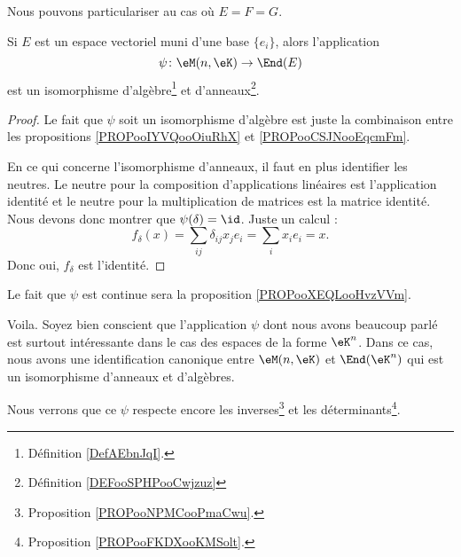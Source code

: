 Nous pouvons particulariser au cas où \( E=F=G\).
\begin{proposition}     \label{PROPooFMBFooEVCLKA}
    Si \( E\) est un espace vectoriel muni d'une base \( \{ e_i \}\), alors l'application
    \begin{equation}
        \psi\colon \eM(n,\eK)\to \End(E)
    \end{equation}
    est un isomorphisme d'algèbre\footnote{Définition \ref{DefAEbnJqI}.} et d'anneaux\footnote{Définition \ref{DEFooSPHPooCwjzuz}}.
\end{proposition}

\begin{proof}
    Le fait que \( \psi\) soit un isomorphisme d'algèbre est juste la combinaison entre les propositions \ref{PROPooIYVQooOiuRhX} et \ref{PROPooCSJNooEqcmFm}.

    En ce qui concerne l'isomorphisme d'anneaux, il faut en plus identifier les neutres. Le neutre pour la composition d'applications linéaires est l'application identité et le neutre pour la multiplication de matrices est la matrice identité. Nous devons donc montrer que \( \psi(\delta)=\id\). Juste un calcul :
    \begin{equation}
        f_{\delta}(x)=\sum_{ij}\delta_{ij}x_je_i=\sum_ix_ie_i=x.
    \end{equation}
    Donc oui, \( f_{\delta}\) est l'identité.
\end{proof}


Le fait que \( \psi\) est continue sera la proposition \ref{PROPooXEQLooHvzVVm}.


Voila. Soyez bien conscient que l'application \( \psi\) dont nous avons beaucoup parlé est surtout intéressante dans le cas des espaces de la forme \( \eK^n\). Dans ce cas, nous avons une identification canonique entre \( \eM(n,\eK)\) et \( \End(\eK^n)\) qui est un isomorphisme d'anneaux et d'algèbres.

Nous verrons que ce \( \psi\) respecte encore les inverses\footnote{Proposition \ref{PROPooNPMCooPmaCwu}.} et les déterminants\footnote{Proposition \ref{PROPooFKDXooKMSolt}.}.

